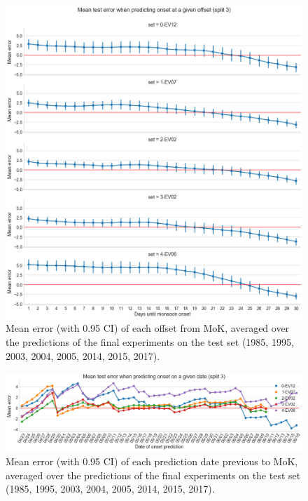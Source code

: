 \begin{figure}[h]
  \centering
  \includegraphics[width=\linewidth]{./99_appendix/img/prediction_error_offset_split.png}
  \caption{Mean error (with 0.95 CI) of each offset from MoK, averaged over the predictions of the final experiments on the test set (1985, 1995, 2003, 2004, 2005, 2014, 2015, 2017).}
  \label{apx:prediction_error_offset_ci}
\end{figure}

\begin{figure}[h]
  \centering
  \includegraphics[width=\linewidth]{./99_appendix/img/prediction_error_dates.png}
  \caption{Mean error (with 0.95 CI) of each prediction date previous to MoK, averaged over the predictions of the final experiments on the test set (1985, 1995, 2003, 2004, 2005, 2014, 2015, 2017).}
  \label{apx:prediction_error_dates_ci}
\end{figure}


